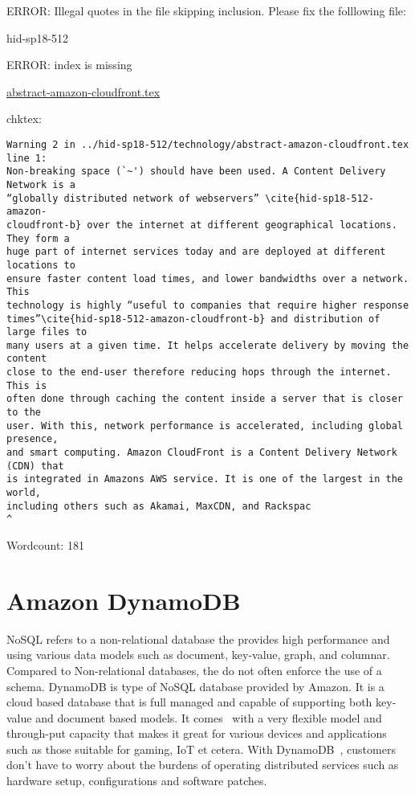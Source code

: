 ERROR: Illegal quotes in the file skipping inclusion. Please fix the folllowing file:

\begin{IU}

hid-sp18-512

ERROR: index is missing

\href{https://github.com/cloudmesh-community/hid-sp18-512/blob/master//technology/abstract-amazon-cloudfront.tex}{abstract-amazon-cloudfront.tex}

 
chktex:
\begin{tiny}
\begin{verbatim}
Warning 2 in ../hid-sp18-512/technology/abstract-amazon-cloudfront.tex line 1:
Non-breaking space (`~') should have been used. A Content Delivery Network is a
“globally distributed network of webservers” \cite{hid-sp18-512-amazon-
cloudfront-b} over the internet at different geographical locations. They form a
huge part of internet services today and are deployed at different locations to
ensure faster content load times, and lower bandwidths over a network. This
technology is highly “useful to companies that require higher response
times”\cite{hid-sp18-512-amazon-cloudfront-b} and distribution of large files to
many users at a given time. It helps accelerate delivery by moving the content
close to the end-user therefore reducing hops through the internet. This is
often done through caching the content inside a server that is closer to the
user. With this, network performance is accelerated, including global presence,
and smart computing. Amazon CloudFront is a Content Delivery Network (CDN) that
is integrated in Amazons AWS service. It is one of the largest in the world,
including others such as Akamai, MaxCDN, and Rackspac
^
\end{verbatim}
\end{tiny}

Wordcount: 181

\end{IU}

\section{Amazon DynamoDB}

NoSQL refers to a non-relational database the provides high performance and using 
various data models such as document, key-value, graph, and columnar.  Compared 
to Non-relational databases, the do not often enforce the use of a schema. 
DynamoDB is type of NoSQL database provided by Amazon. It is a cloud based 
database that is full managed and capable of supporting both key-value and 
document based models. It comes~\cite{hid-sp18-512-amazon-dynamodb} with a 
very flexible model and through-put capacity that makes it great for various 
devices and applications such as those suitable for gaming, IoT et cetera. 
With DynamoDB~\cite{hid-sp18-512-amazon-dynamodb_faq}, customers don’t have 
to worry about the burdens of operating distributed services such as hardware 
setup, configurations and software patches.



